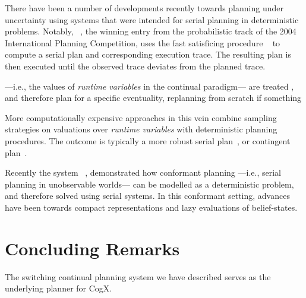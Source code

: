 \documentclass[letterpaper]{article}
\begin{document}
There have been a number of developments recently towards planning
under uncertainty using systems that were intended for serial planning
in deterministic problems.  Notably,
~\cite{yoon:etal:2007}, the winning entry from the
probabilistic track of the 2004 International Planning Competition,
uses the fast satisficing procedure
~\cite{hoffmann:nebel:2001} to compute a serial plan and
corresponding execution trace. The resulting plan is then executed
until the observed trace deviates from the planned trace.

 ---i.e., the values of {\em
runtime variables} in the continual paradigm--- are treated , and
therefore plan for a specific eventuality, replanning from scratch if
something


More computationally expensive approaches in this vein combine
sampling strategies on valuations over {\em runtime variables} with
deterministic planning procedures. The outcome is typically a more
robust serial plan~\cite{yoon:etal:2008}, or contingent
plan~\cite{majercik:2006}.



Recently the system
~\cite{hoffmann:brafman:2006}, demonstrated how
conformant planning ---i.e., serial planning in unobservable worlds---
can be modelled as a deterministic problem, and therefore solved using
serial systems. In this conformant setting, advances have been towards
compact representations and lazy evaluations of belief-states.
 

\section{Concluding Remarks}

The switching continual planning system we have described serves as
the underlying planner for CogX. 




\end{document}
